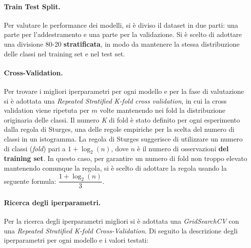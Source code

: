 \paragraph{Train Test Split.} Per valutare le performance dei modelli, si è diviso il dataset in due parti: una parte per l'addestramento e una parte per la validazione. Si è scelto di adottare una divisione 80-20 \textbf{stratificata}, in modo da mantenere la stessa distribuzione delle classi nel training set e nel test set.
\paragraph{Cross-Validation.} Per trovare i migliori iperparametri per ogni modello e per la fase di valutazione si è adottata una \textit{Repeated Stratified K-fold cross validation}, in cui la cross validation viene ripetuta per $m$ volte mantenendo nei fold la distribuzione originaria delle classi. Il numero \textit{K} di fold è stato definito per ogni esperimento dalla regola di Sturges, una delle regole empiriche per la scelta del numero di classi in un istogramma. La regola di Sturges suggerisce di utilizzare un numero di classi (\textit{fold}) pari a $1 + \log_2(n)$, dove $n$ è il numero di osservazioni \textbf{del training set}. In questo caso, per garantire un numero di fold non troppo elevato mantenendo comunque la regola, si è scelto di adottare la regola usando la seguente formula: $\dfrac{1 + \log_2(n)}{3}$.
\paragraph{Ricerca degli iperparametri.} Per la ricerca degli iperparametri migliori si è adottata una \textit{GridSearchCV} con una \textit{Repeated Stratified K-fold Cross-Validation}. Di seguito la descrizione degli iperparametri per ogni modello e i valori testati:

